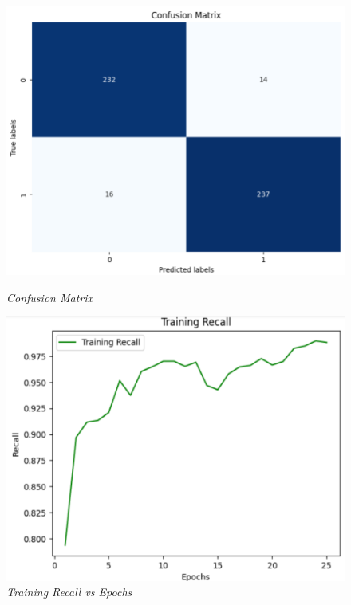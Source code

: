 \documentclass[12pt, a4paper]{report}
\begin{document}
\begin{figure}[htbp]
    \centering
    \begin{minipage}{0.4\textwidth}
        \centering
        \includegraphics[width=\linewidth]{report images/image15.png}
        \caption{\textit{Confusion Matrix}}
    \end{minipage}%
    \hspace{0.05\textwidth} %
    \begin{minipage}{0.4\textwidth}
        \centering
        \includegraphics[width=\linewidth]{report images/image16.png}
        \caption{\textit{Training Recall vs Epochs}}
    \end{minipage}
\end{figure}
\end{document}
